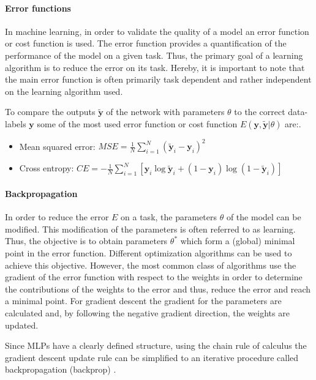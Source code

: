 \paragraph{Error functions} \label{c:mlperr}

In machine learning, in order to validate the quality of a model an error function or cost function is used.
The error function provides a quantification of the performance of the model on a given task.
Thus, the primary goal of a learning algorithm is to reduce the error on its task.
Hereby, it is important to note that the main error function is often primarily task dependent and rather independent on the learning algorithm used.  

To compare the outputs $\tilde{\textbf{y}}$ of the network with parameters $\theta$ to the correct data-labels $\textbf{y}$ some of the most used error function or cost function $E(\textbf{y},\tilde{\textbf{y}} | \theta)$ are:.

\begin{itemize}
	\item Mean squared error: $MSE = \frac{1}{N} \sum_{i=1}^N (\tilde{\textbf{y}}_i - \textbf{y}_i)^2 $
	\item Cross entropy: $CE = - \frac{1}{N} \sum_{i=1}^N [ \textbf{y}_i \log \tilde{\textbf{y}}_i + (1 - \textbf{y}_i) \log (1 - \tilde{\textbf{y}}_i)]$
\end{itemize}

\paragraph{Backpropagation} \label{c:backprop}

In order to reduce the error $E$ on a task, the parameters $\theta$ of the model can be modified.
This modification of the parameters is often referred to as learning.
Thus, the objective is to obtain parameters $\theta^*$ which form a (global) minimal point in the error function. 
Different optimization algorithms can be used to achieve this objective.
However, the most common class of algorithms use the gradient of the error function with respect to the weights in order to determine the contributions of the weights to the error and thus, reduce the error and reach a minimal point.
For gradient descent the gradient for the parameters are calculated and, by following the negative gradient direction, the weights are updated.

Since MLPs have a clearly defined structure, using the chain rule of calculus the gradient descent update rule can be simplified to an iterative procedure called backpropagation (backprop)  \cite{Goodfellow-et-al-2016-Book}\cite{rumelhart1985learning}.


